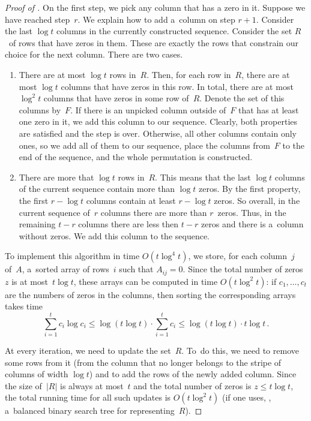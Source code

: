 \begin{proof}[Proof of {}]
    On the first step, we pick any column that has a zero in it. Suppose
    we have reached step~$r$. We explain how to add a~column on
    step $r+1$. Consider the last $\log t$ columns in the currently
    constructed sequence. Consider the set $R$~of rows that have
    zeros in them. These are exactly the rows that constrain our
    choice for the next column. There are two cases.
    \begin{enumerate}
        \item There are at most $\log t$ rows in~$R$. Then, for each row in~$R$, there
        are at most $\log t$ columns that have zeros in this row. In total, there are at
        most $\log^2 t$ columns that have zeros in some row of~$R$. Denote the set of
        this columns by~$F$. If there is an unpicked column outside of~$F$ that has at
        least one zero in it, we add this column to our sequence. Clearly, both
        properties are satisfied and the step is over. Otherwise, all other columns
        contain only ones, so we add all of them to our sequence, place the columns
        from~$F$ to the end of the sequence, and the whole permutation is constructed.
        \item There are more that $\log t$ rows in~$R$. This means that the last
        $\log t$ columns of the current sequence contain more than $\log t$ zeros. By
        the first property, the first $r - \log t$ columns contain at least $r - \log t$
        zeros. So overall, in the current sequence of~$r$ columns there are more than
        $r$~zeros. Thus, in the remaining $t-r$ columns there are less then $t-r$ zeros
        and there is a~column without zeros. We add this column to the sequence.
    \end{enumerate}


    To implement this algorithm in time $O(t\log^{4}t)$, we store, for each
    column~$j$ of~$A$, a~sorted array of rows~$i$ such that $A_{ij}=0$. Since the
    total number of zeros~$z$ is at most~$t\log t$, these arrays can be computed in
    time $O(t\log^2t)$: if $c_1, \dotsc, c_t$ are the numbers of zeros in the
    columns, then sorting the corresponding arrays takes time
    \[\sum_{i=1}^{t}c_i \log c_i \le \log(t \log t) \cdot \sum_{i=1}^{t}c_i \le \log(t \log t) \cdot t\log t \, .\]

    At every iteration, we need to update the set~$R$. To~do this, we need to remove
    some rows from it (from the column that no longer belongs to the stripe of
    columns of width $\log t$) and to add the rows of the newly added column. Since
    the size of~$|R|$ is always at most~$t$ and the total number of zeros is
    $z \le t\log t$, the total running time for all such updates is
    $O(t\log^2t)$ (if one uses, \eg, a~balanced binary search tree for
    representing~$R$).


\end{proof}
